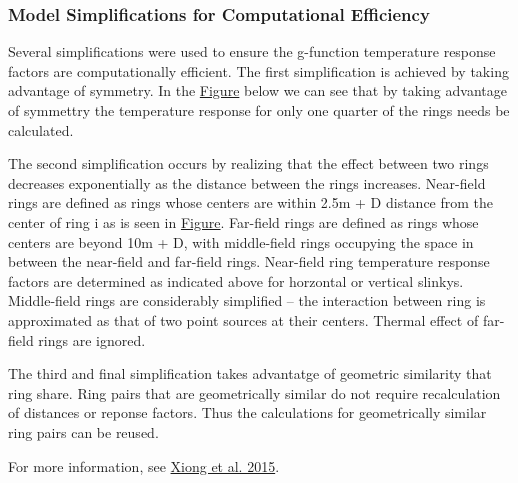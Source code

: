 \subsubsection{Model Simplifications for Computational Efficiency}\label{model-simplifications-for-computational-efficiency}

Several simplifications were used to ensure the g-function temperature response factors are computationally efficient. The first simplification is achieved by taking advantage of symmetry. In the \protect\hyperlink{SlinkyGHX1}{Figure} below we can see that by taking advantage of symmettry the temperature response for only one quarter of the rings needs be calculated.

The second simplification occurs by realizing that the effect between two rings decreases exponentially as the distance between the rings increases. Near-field rings are defined as rings whose centers are within 2.5m + D distance from the center of ring i as is seen in \protect\hyperlink{SlinkyGHX1}{Figure}. Far-field rings are defined as rings whose centers are beyond 10m + D, with middle-field rings occupying the space in between the near-field and far-field rings. Near-field ring temperature response factors are determined as indicated above for horzontal or vertical slinkys. Middle-field rings are considerably simplified -- the interaction between ring is approximated as that of two point sources at their centers. Thermal effect of far-field rings are ignored.

The third and final simplification takes advantatge of geometric similarity that ring share. Ring pairs that are geometrically similar do not require recalculation of distances or reponse factors. Thus the calculations for geometrically similar ring pairs can be reused.

For more information, see \protect\hyperlink{SlinkyReferenceXiong}{Xiong et al. 2015}.

